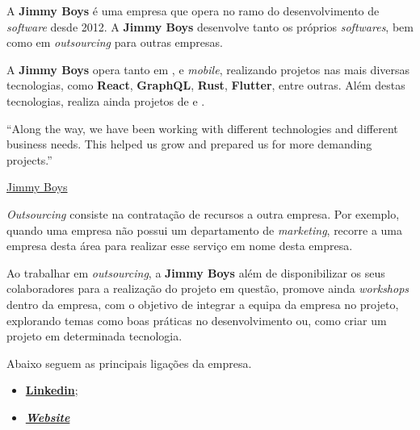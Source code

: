 
\begin{minipage}[t!]{0.35\textwidth}
\end{minipage}
\begin{minipage}[t!]{.65\textwidth}
	\minipagerestore

	A \textbf{Jimmy Boys} é uma empresa que opera no ramo do desenvolvimento de \textit{software} desde 2012. A \textbf{Jimmy Boys} desenvolve tanto os próprios \textit{softwares}, bem como em \textit{outsourcing} para outras empresas.

	A \textbf{Jimmy Boys} opera tanto em \textit{}, \textit{} e \textit{mobile}, realizando projetos nas mais diversas tecnologias, como \textbf{React}, \textbf{GraphQL}, \textbf{Rust}, \textbf{Flutter}, entre outras. Além destas tecnologias, realiza ainda projetos de  e .
\end{minipage}

\vspace{0.2cm}

\begin{flushright}
	\begin{quotebox50}
		``Along the way, we have been working with different technologies and different business needs. This helped us grow and prepared us for more demanding projects.''

		\tcblower

		\href{https://www.jimmyboys.pt/about-us}{Jimmy Boys}
	\end{quotebox50}
\end{flushright}

\vspace{0.2cm}

\textit{Outsourcing} consiste na contratação de recursos a outra empresa. Por exemplo, quando uma empresa não possui um departamento de \textit{marketing}, recorre a uma empresa desta área para realizar esse serviço em nome desta empresa.

Ao trabalhar em \textit{outsourcing}, a \textbf{Jimmy Boys} além de disponibilizar os seus colaboradores para a realização do projeto em questão, promove ainda \textit{workshops} dentro da empresa, com o objetivo de integrar a equipa da empresa no projeto, explorando temas como boas práticas no desenvolvimento ou, como criar um projeto em determinada tecnologia.

Abaixo seguem as principais ligações da empresa.

\begin{itemize}
	\item \textbf{\href{https://www.linkedin.com/company/jimmy-boys/}{Linkedin}};
	\item \textbf{\href{https://jimmyboys.pt}{\textit{Website}}}
\end{itemize}